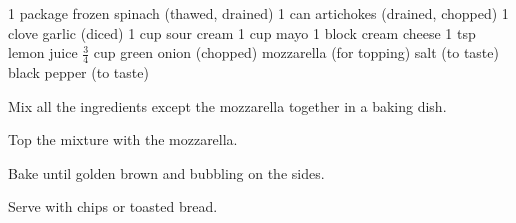 \dishtype{\apps}
\dishother{\vegetarian}
\begin{ingreds}
    1 package frozen spinach (thawed, drained)
    1 can artichokes (drained, chopped)
    1 clove garlic (diced)
    1 cup sour cream
    1 cup mayo
    1 block cream cheese
    1 tsp lemon juice
    $\frac{3}{4}$ cup green onion (chopped)
    mozzarella (for topping)
    salt (to taste)
    black pepper (to taste)
\end{ingreds}
\begin{method}
    Mix all the ingredients except the mozzarella together in a baking dish.\par
    Top the mixture with the mozzarella.\par
    Bake until golden brown and bubbling on the sides.\par
    Serve with chips or toasted bread.
\end{method}
